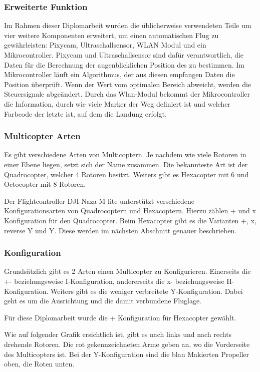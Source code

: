   \subsubsection{Erweiterte Funktion}
  Im Rahmen dieser Diplomarbeit wurden die üblicherweise verwendeten Teile um vier weitere Komponenten erweitert, um einen automatischen Flug zu gewährleisten: Pixycam, Ultraschallsensor, WLAN Modul und ein Mikrocontroller. Pixycam und Ultraschallsensor sind dafür verantwortlich, die Daten für die Berechnung der augenblicklichen Position des zu bestimmen. Im Mikrocontroller läuft ein Algorithmus, der aus diesen empfangen Daten die Position überprüft. Wenn der Wert vom optimalen Bereich abweicht, werden die Steuersignale abgeändert. Durch das Wlan-Modul bekommt der Mikrocontroller die Information, durch wie viele Marker der Weg definiert ist und welcher Farbcode der letzte ist, auf dem die Landung erfolgt.


  \subsubsection{Multicopter Arten}
  Es gibt verschiedene Arten von Multicoptern.
  Je nachdem wie viele Rotoren in einer Ebene liegen, setzt sich der Name zusammen.
  Die bekannteste Art ist der Quadrocopter, welcher 4 Rotoren besitzt. Weiters gibt es Hexacopter mit 6 und Octocopter mit 8 Rotoren. \cite{GrundlagenMulticopter}

  Der Flightcontroller DJI Naza-M lite unterstützt verschiedene Konfigurationsarten von Quadrocoptern und Hexacoptern. Hierzu zählen + und x Konfiguration für den Quadrocopter. Beim Hexacopter gibt es die Varianten +, x, reverse Y und Y. Diese werden im nächsten Abschnitt genauer beschrieben. \cite{NAZA_Konfig}

  \subsubsection{Konfiguration}
  Grundsätzlich gibt es 2 Arten einen Multicopter zu Konfigurieren. \cite{GrundlagenMulticopter}
  Einerseits die +- beziehungsweise I-Konfiguration, andererseits die x- beziehungsweise H-Konfiguration. Weiters gibt es die weniger verbreitete Y-Konfiguration. Dabei geht es um die Ausrichtung und die damit verbundene Fluglage.

  Für diese Diplomarbeit wurde die + Konfiguration für Hexacopter gewählt.

  Wie auf folgender Grafik ersichtlich ist, gibt es nach links und nach rechts drehende Rotoren. Die rot gekennzeichneten Arme geben an, wo die Vorderseite des Multicopters ist. Bei der Y-Konfiguration sind die blau Makierten Propeller oben, die Roten unten.

